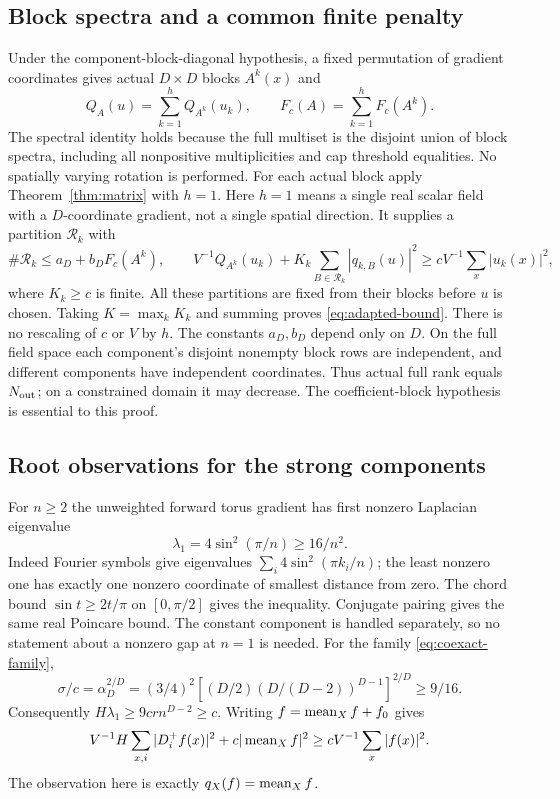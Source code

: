 \subsection{Block spectra and a common finite penalty}
Under the component-block-diagonal hypothesis, a fixed permutation of
gradient coordinates gives actual $D\times D$ blocks $A^k(x)$ and
\[
 Q_A(u)=\sum_{k=1}^h Q_{A^k}(u_k),\qquad
 F_c(A)=\sum_{k=1}^hF_c(A^k).
\]
The spectral identity holds because the full multiset is the disjoint
union of block spectra, including all nonpositive multiplicities and cap
threshold equalities. No spatially varying rotation is performed.
For each actual block apply Theorem~\ref{thm:matrix} with $h=1$.
Here $h=1$ means a single real scalar field with a $D$-coordinate gradient,
not a single spatial direction. It supplies a partition $\mathcal R_k$ with
\[
 \#\mathcal R_k\le a_D+b_DF_c(A^k),\qquad
 V^{-1}Q_{A^k}(u_k)+K_k\sum_{B\in\mathcal R_k}|q_{k,B}(u)|^2
                      \ge cV^{-1}\sum_x|u_k(x)|^2,
\]
where $K_k\ge c$ is finite. All these partitions are fixed from their
blocks before $u$ is chosen. Taking $K=\max_kK_k$ and summing proves
\eqref{eq:adapted-bound}. There is no rescaling of $c$ or $V$ by $h$.
The constants $a_D,b_D$ depend only on $D$.
On the full field space each component's disjoint nonempty block rows are
independent, and different components have independent coordinates.
Thus actual full rank equals $N_{\rm out}$; on a constrained domain it
may decrease. The coefficient-block hypothesis is essential to this proof.

\subsection{Root observations for the strong components}
For $n\ge2$ the unweighted forward torus gradient has first nonzero
Laplacian eigenvalue
\begin{equation}\label{eq:torus-gap}
 \lambda_1=4\sin^2(\pi/n)\ge16/n^2.
\end{equation}
Indeed Fourier symbols give eigenvalues
$\sum_i4\sin^2(\pi k_i/n)$; the least nonzero one has exactly one
nonzero coordinate of smallest distance from zero. The chord bound
$\sin t\ge2t/\pi$ on $[0,\pi/2]$ gives the inequality.
Conjugate pairing gives the same real Poincare bound. The constant
component is handled separately, so no statement about a nonzero gap at
$n=1$ is needed.
For the family \eqref{eq:coexact-family},
\[
 \sigma/c=\alpha_D^{2/D}
 =(3/4)^2[(D/2)(D/(D-2))^{D-1}]^{2/D}\ge9/16.
\]
Consequently $H\lambda_1\ge9crn^{D-2}\ge c$.
Writing $f=\operatorname{mean}_Xf+f_0$ gives
\begin{equation}\label{eq:root-strong}
 V^{-1}H\sum_{x,i}|D_i^+f(x)|^2+c|\operatorname{mean}_Xf|^2
                                      \ge cV^{-1}\sum_x|f(x)|^2.
\end{equation}
The observation here is exactly $q_X(f)=\operatorname{mean}_Xf$.

